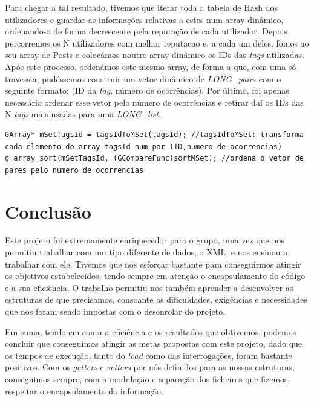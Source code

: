 \documentclass[a4paper, 11pt, oneside]{article}
\begin{document}
Para chegar a tal resultado, tivemos que iterar toda a tabela de Hash dos utilizadores e guardar as informações relativas a estes num array dinâmico, ordenando-o de forma decrescente pela reputação de cada utilizador. Depois percorremos os N utilizadores com melhor reputacao e, a cada um deles, fomos ao seu array de Posts e colocámos noutro array dinâmico os IDs das \textit{tags} utilizadas. Após este processo, ordenámos este mesmo array, de forma a que, com uma só travessia, pudéssemos construir um vetor dinâmico de \textit{LONG\_pair}s com o seguinte formato: (ID da \textit{tag}, número de ocorrências). Por último, foi apenas necessário ordenar esse vetor pelo número de ocorrências e retirar daí os IDs das N \textit{tags} mais usadas para uma \textit{LONG\_list}.

\begin{lstlisting}[caption=Query 11 - conversão do array de tags para um de pares e respetiva ordenação]
GArray* mSetTagsId = tagsIdToMSet(tagsId); //tagsIdToMSet: transforma cada elemento do array tagsId num par (ID,numero de ocorrencias)
g_array_sort(mSetTagsId, (GCompareFunc)sortMSet); //ordena o vetor de pares pelo numero de ocorrencias
\end{lstlisting}

\section{Conclusão}
Este projeto foi extremamente enriquecedor para o grupo, uma vez que nos permitiu trabalhar com um tipo diferente de dados, o XML, e nos ensinou a trabalhar com ele. Tivemos que nos esforçar bastante para conseguirmos atingir os objetivos estabelecidos, tendo sempre em atenção o encapsulamento do código e a sua eficiência. O trabalho permitiu-nos também aprender a desenvolver as estruturas de que precisamos, consoante as dificuldades, exigências e necessidades
que nos foram sendo impostas com o desenrolar do projeto.

Em suma, tendo em conta a eficiência e os resultados que obtivemos, podemos concluir que conseguimos atingir as metas propostas com este projeto, dado que os tempos de execução, tanto do \textit{load} como das interrogações, foram bastante positivos. Com os \textit{getters} e \textit{setters} por nós definidos para as nossas estruturas, conseguimos sempre, com a modulação e separação dos ficheiros que fizemos, respeitar o encapsulamento da informação.
\end{document}

